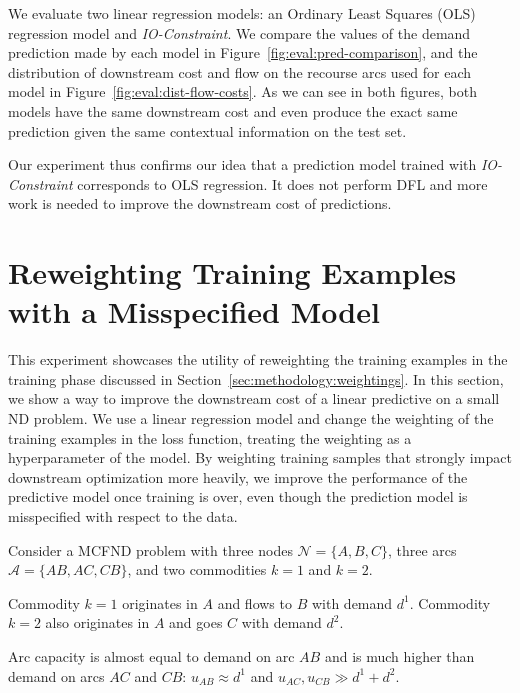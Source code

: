 We evaluate two linear regression models: an Ordinary Least Squares (OLS) regression model and \textit{IO-Constraint}. We compare the values of the demand prediction made by each model in Figure~\ref{fig:eval:pred-comparison}, and the distribution of downstream cost and flow on the recourse arcs used for each model in Figure~\ref{fig:eval:dist-flow-costs}. As we can see in both figures, both models have the same downstream cost and even produce the exact same prediction given the same contextual information on the test set. 

Our experiment thus confirms our idea that a prediction model trained with \textit{IO-Constraint} corresponds to OLS regression. It does not perform DFL and more work is needed to improve the downstream cost of predictions. 




\section{Reweighting Training Examples with a Misspecified Model} \label{sec:eval:reweighting}

This experiment showcases the utility of reweighting the training examples in the training phase discussed in Section~\ref{sec:methodology:weightings}. In this section, we show a way to improve the downstream cost of a linear predictive on a small ND problem. We use a linear regression model and change the weighting of the training examples in the loss function, treating the weighting as a hyperparameter of the model. By weighting training samples that strongly impact downstream optimization more heavily, we improve the performance of the predictive model once training is over, even though the prediction model is misspecified with respect to the data.

Consider a MCFND problem with three nodes $\mathcal{N} = \{A,B,C\}$, three arcs $\mathcal{A} = \{AB, AC, CB\}$, and two commodities $k=1$ and $k=2$.

\begin{minipage}{0.45\textwidth}
    
\end{minipage}
\begin{minipage}{0.45\textwidth}
    Commodity $k=1$ originates in $A$ and flows to $B$ with demand $d^1$. Commodity $k=2$ also originates in $A$ and goes $C$ with demand $d^2$. 

    Arc capacity is almost equal to demand on arc $AB$ and is much higher than demand on arcs $AC$ and $CB$: $u_{AB} \approx d^1$ and $u_{AC}, u_{CB} \gg d^1 + d^2$.
\end{minipage}

